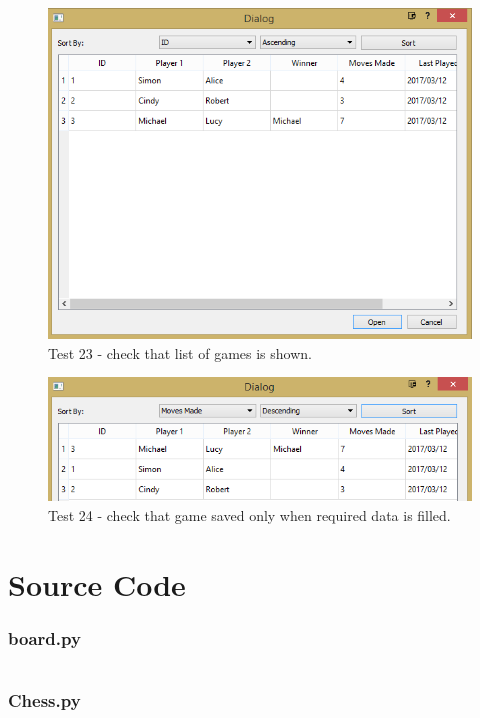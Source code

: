 \begin{figure}[H]
	\centering
	\includegraphics[width=1.0\textwidth]{images/screenshots/test-23}
	\caption{Test 23 - check that list of games is shown.}
	\label{test-23}
\end{figure}
\begin{figure}[H]
	\centering
	\includegraphics[width=1.0\textwidth]{images/screenshots/test-24}
	\caption{Test 24 - check that game saved only when required data is filled.}
	\label{test-24}
\end{figure}
\section{Source Code}
\subsubsection{board.py}
\begin{longlisting}
	\inputminted[breaklines, linenos, breakanywhere, tabsize=4, baselinestretch=1.0, fontsize=\footnotesize]{python}{../src/board.py}
\end{longlisting}
\subsubsection{Chess.py}
\begin{longlisting}
	\inputminted[breaklines, linenos, breakanywhere, tabsize=4, baselinestretch=1.0, fontsize=\footnotesize]{python}{../src/Chess.py}
\end{longlisting}

